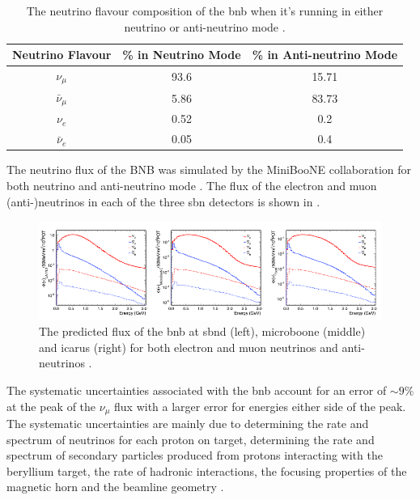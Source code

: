 \begin{table}[h]
\begin{tabular}{ccc}
Neutrino Flavour & \% in Neutrino Mode & \% in Anti-neutrino Mode \\ \hline
$\nu_\mu$        & 93.6                & 15.71                    \\
$\bar{\nu}_{\mu}$  & 5.86                & 83.73                    \\
$\nu_e$          & 0.52                & 0.2                      \\
$\bar{\nu}_{e}$    & 0.05                & 0.4                     
\end{tabular}
\caption[BNB flavour composition.]{The neutrino flavour composition of the \gls{bnb} when it's running in either neutrino or anti-neutrino mode \cite{BNB_flux}.}
\label{Table: BNB composition}
\end{table}

 The neutrino flux of the BNB was simulated by the MiniBooNE collaboration for both neutrino and anti-neutrino mode \cite{BNB_flux}. The flux of the electron and muon (anti-)neutrinos in each of the three \gls{sbn} detectors is shown in .
 \begin{figure}[h!]
     \centering
     \includegraphics[width = \largefigwidth]{figures-chap3/SBN_flux.png}
     \caption[Neutrino fluxes in SBN.]{The predicted flux of the \gls{bnb} at \gls{sbnd} (left), \gls{microboone} (middle) and \gls{icarus} (right) for both electron and muon neutrinos and anti-neutrinos \cite{SBN_Proposal}.}
     \label{fig: SBN flux}
\end{figure}
The systematic uncertainties associated with the \gls{bnb} account for an error of $\sim 9\%$ at the peak of the $\nu_\mu$ flux with a larger error for energies either side of the peak. The systematic uncertainties are mainly due to determining the rate and spectrum of neutrinos for each proton on target, determining the rate and spectrum of secondary particles produced from protons interacting with the beryllium target, the rate of hadronic interactions, the focusing properties of the magnetic horn and the beamline geometry \cite{BNB_flux}. 



